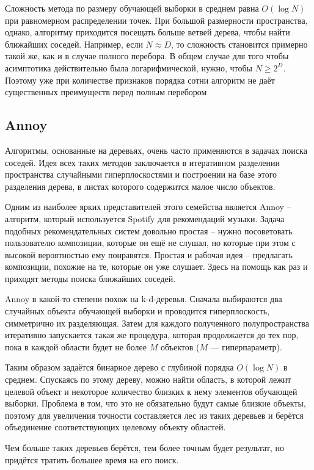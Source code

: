 Сложность метода по размеру обучающей выборки в среднем равна $O(\log N)$ при равномерном распределении точек.
При большой размерности пространства, однако, алгоритму приходится посещать больше ветвей дерева, чтобы найти
ближайших соседей.
Например, если $N \approx D$, то сложность становится примерно такой же, как и в случае полного перебора.
В общем случае для того чтобы асимптотика действительно была логарифмической, нужно, чтобы $N \geq 2^D$.
Поэтому уже при количестве признаков порядка сотни алгоритм не даёт существенных преимуществ перед полным перебором

\subsection{Annoy}

Алгоритмы, основанные на деревьях, очень часто применяются в задачах поиска соседей.
Идея всех таких методов заключается в итеративном разделении пространства случайными гиперплоскостями и построении
на базе этого разделения дерева, в листах которого содержится малое число объектов.

Одним из наиболее ярких представителей этого семейства является Annoy -- алгоритм, который используется Spotify
для рекомендаций музыки.
Задача подобных рекомендательных систем довольно простая -- нужно посоветовать пользователю композиции, которые
он ещё не слушал, но которые при этом с высокой вероятностью ему понравятся.
Простая и рабочая идея -- предлагать композиции, похожие на те, которые он уже слушает.
Здесь на помощь как раз и приходят методы поиска ближайших соседей.

Annoy в какой-то степени похож на k-d-деревья.
Сначала выбираются два случайных объекта обучающей выборки и проводится гиперплоскость, симметрично их разделяющая.
Затем для каждого полученного полупространства итеративно запускается такая же процедура, которая продолжается до
тех пор, пока в каждой области будет не более $M$ объектов ($M$ — гиперпараметр).

Таким образом задаётся бинарное дерево с глубиной порядка $O(\log N)$ в среднем.
Спускаясь по этому дереву, можно найти область, в которой лежит целевой объект и некоторое количество близких к нему
элементов обучающей выборки.
Проблема в том, что это не обязательно будут самые близкие объекты, поэтому для увеличения точности составляется лес
из таких деревьев и берётся объединение соответствующих целевому объекту областей.

Чем больше таких деревьев берётся, тем более точным будет результат, но придётся тратить большее время на его поиск.

